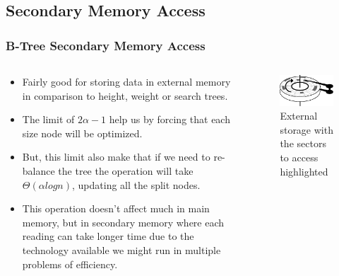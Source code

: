 \documentclass{beamer}
\begin{document}
\begin{frame}
    \subsection{Secondary Memory Access}
    \frametitle{B-Tree Secondary Memory Access}
    \begin{columns}
        \begin{column}{.7\textwidth}
            \begin{block}{}
                \begin{itemize}
                    \item Fairly good for storing data in external memory in comparison to height, weight or search trees.
                    \item The limit of \(2\alpha - 1\) help us by forcing that each size node will be optimized.
                    \item But, this limit also make that if we need to re-balance the tree the 
                        operation will take \(\Theta\left(\alpha log n\right)\), updating all the split nodes.
                    \item This operation doesn't affect much in main memory, but in secondary memory where each reading can take longer time due to the technology available we might run in multiple problems of efficiency.
                \end{itemize}
            \end{block}
        \end{column}
        \begin{column}{.35\textwidth}
            \begin{block}{}
                \begin{figure}[h!]
                    \includegraphics[width=\linewidth]{resources/made/external_storage_wblocks.eps}
                    \caption{External storage with the sectors to access highlighted}
                    \label{external_storage_wblocks}
                \end{figure}
            \end{block}
        \end{column}
    \end{columns}
\end{frame}
   
\end{document}
